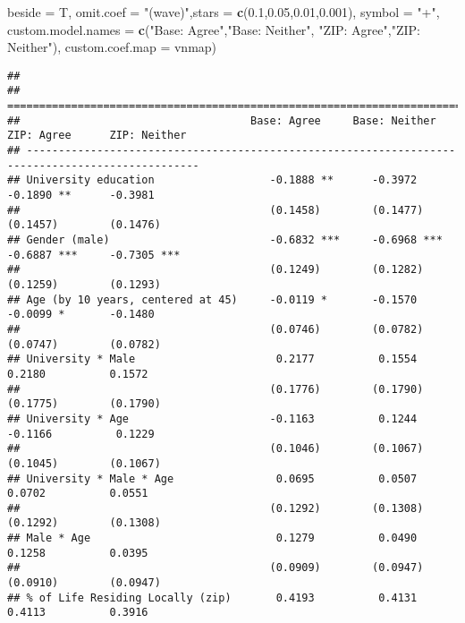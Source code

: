 \documentclass[
]{article}
\newenvironment{Shaded}{\begin{snugshade}}{\end{snugshade}}
\newcommand{\DataTypeTok}[1]{\textcolor[rgb]{0.13,0.29,0.53}{#1}}
\newcommand{\FloatTok}[1]{\textcolor[rgb]{0.00,0.00,0.81}{#1}}
\newcommand{\KeywordTok}[1]{\textcolor[rgb]{0.13,0.29,0.53}{\textbf{#1}}}
\newcommand{\NormalTok}[1]{#1}
\newcommand{\StringTok}[1]{\textcolor[rgb]{0.31,0.60,0.02}{#1}}
\begin{document}
\begin{Shaded}
\begin{Highlighting}[]
          \DataTypeTok{beside =}\NormalTok{ T,}
          \DataTypeTok{omit.coef =} \StringTok{"(wave)"}\NormalTok{,}\DataTypeTok{stars =} \KeywordTok{c}\NormalTok{(}\FloatTok{0.1}\NormalTok{,}\FloatTok{0.05}\NormalTok{,}\FloatTok{0.01}\NormalTok{,}\FloatTok{0.001}\NormalTok{), }\DataTypeTok{symbol =} \StringTok{"+"}\NormalTok{, }
          \DataTypeTok{custom.model.names =} \KeywordTok{c}\NormalTok{(}\StringTok{"Base: Agree"}\NormalTok{,}\StringTok{"Base: Neither"}\NormalTok{,}
                                 \StringTok{"ZIP: Agree"}\NormalTok{,}\StringTok{"ZIP: Neither"}\NormalTok{),}
          \DataTypeTok{custom.coef.map =}\NormalTok{ vnmap)}
\end{Highlighting}
\end{Shaded}

\begin{verbatim}
## 
## =================================================================================================
##                                    Base: Agree     Base: Neither   ZIP: Agree      ZIP: Neither  
## -------------------------------------------------------------------------------------------------
## University education                  -0.1888 **      -0.3972         -0.1890 **      -0.3981    
##                                       (0.1458)        (0.1477)        (0.1457)        (0.1476)   
## Gender (male)                         -0.6832 ***     -0.6968 ***     -0.6887 ***     -0.7305 ***
##                                       (0.1249)        (0.1282)        (0.1259)        (0.1293)   
## Age (by 10 years, centered at 45)     -0.0119 *       -0.1570         -0.0099 *       -0.1480    
##                                       (0.0746)        (0.0782)        (0.0747)        (0.0782)   
## University * Male                      0.2177          0.1554          0.2180          0.1572    
##                                       (0.1776)        (0.1790)        (0.1775)        (0.1790)   
## University * Age                      -0.1163          0.1244         -0.1166          0.1229    
##                                       (0.1046)        (0.1067)        (0.1045)        (0.1067)   
## University * Male * Age                0.0695          0.0507          0.0702          0.0551    
##                                       (0.1292)        (0.1308)        (0.1292)        (0.1308)   
## Male * Age                             0.1279          0.0490          0.1258          0.0395    
##                                       (0.0909)        (0.0947)        (0.0910)        (0.0947)   
## % of Life Residing Locally (zip)       0.4193          0.4131          0.4113          0.3916    

\end{verbatim}
\end{document}
